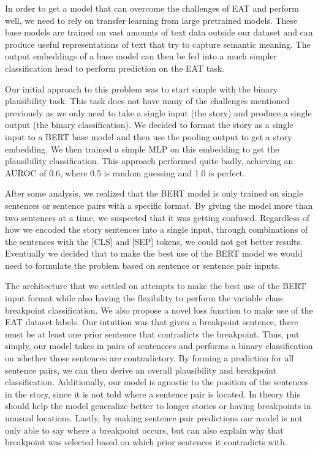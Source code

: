 \documentclass[11pt,a4paper]{article}
\begin{document}
In order to get a model that can overcome the challenges of EAT and perform well, we need to rely on transfer learning from large pretrained models. These base models are trained on vast amounts of text data outside our dataset and can produce useful representations of text that try to capture semantic meaning. The output embeddings of a base model can then be fed into a much simpler classification head to perform prediction on the EAT task.

Our initial approach to this problem was to start simple with the binary plausibility task. This task does not have many of the challenges mentioned previously as we only need to take a single input (the story) and produce a single output (the binary classification). We decided to format the story as a single input to a BERT base model and then use the pooling output to get a story embedding. We then trained a simple MLP on this embedding to get the plausibility classification. This approach performed quite badly, achieving an AUROC of 0.6, where 0.5 is random guessing and 1.0 is perfect. 

After some analysis, we realized that the BERT model is only trained on single sentences or sentence pairs with a specific format. By giving the model more than two sentences at a time, we suspected that it was getting confused. Regardless of how we encoded the story sentences into a single input, through combinations of the sentences with the [CLS] and [SEP] tokens, we could not get better results. Eventually we decided that to make the best use of the BERT model we would need to formulate the problem based on sentence or sentence pair inputs.

The architecture that we settled on attempts to make the best use of the BERT input format while also having the flexibility to perform the variable class breakpoint classification. We also propose a novel loss function to make use of the EAT dataset labels. Our intuition was that given a breakpoint sentence, there must be at least one prior sentence that contradicts the breakpoint. Thus, put simply, our model takes in pairs of sentencces and performs a binary classification on whether those sentences are contradictory. By forming a prediction for all sentence pairs, we can then derive an overall plausibility and breakpoint classification. Additionally, our model is agnostic to the position of the sentences in the story, since it is not told where a sentence pair is located. In theory this should help the model generalize better to longer stories or having breakpoints in unusual locations. Lastly, by making sentence pair predictions our model is not only able to say where a breakpoint occurs, but can also explain why that breakpoint was selected based on which prior sentences it contradicts with.
\end{document}
